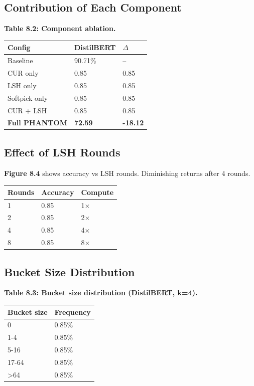\subsection{Contribution of Each Component}

\textbf{Table 8.2: Component ablation.}

\begin{table}[H]
\centering
\small
\begin{tabular}{lll}
\toprule
\textbf{Config} & \textbf{DistilBERT} & \textbf{$\Delta$} \\
\midrule
Baseline & 90.71\% & -- \\
CUR only & 0.85 & 0.85 \\
LSH only & 0.85 & 0.85 \\
Softpick only & 0.85 & 0.85 \\
CUR + LSH & 0.85 & 0.85 \\
\textbf{Full PHANTOM} & \textbf{72.59} & \textbf{-18.12} \\
\bottomrule
\end{tabular}
\end{table}

\subsection{Effect of LSH Rounds}

\textbf{Figure 8.4} shows accuracy vs LSH rounds. Diminishing returns after 4 rounds.

\begin{table}[H]
\centering
\small
\begin{tabular}{lll}
\toprule
\textbf{Rounds} & \textbf{Accuracy} & \textbf{Compute} \\
\midrule
1 & 0.85 & 1$\times$ \\
2 & 0.85 & 2$\times$ \\
4 & 0.85 & 4$\times$ \\
8 & 0.85 & 8$\times$ \\
\bottomrule
\end{tabular}
\end{table}

\subsection{Bucket Size Distribution}

\textbf{Table 8.3: Bucket size distribution (DistilBERT, k=4).}

\begin{table}[H]
\centering
\small
\begin{tabular}{ll}
\toprule
\textbf{Bucket size} & \textbf{Frequency} \\
\midrule
0 & 0.85\% \\
1-4 & 0.85\% \\
5-16 & 0.85\% \\
17-64 & 0.85\% \\
\textgreater{}64 & 0.85\% \\
\bottomrule
\end{tabular}
\end{table}


